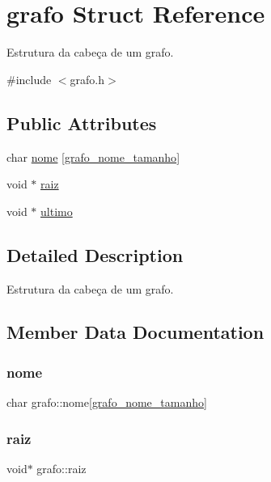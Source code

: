 \hypertarget{structgrafo}{}\section{grafo Struct Reference}
\label{structgrafo}


Estrutura da cabeça de um grafo.  




{\ttfamily \#include $<$grafo.\+h$>$}

\subsection*{Public Attributes}
\begin{DoxyCompactItemize}
\item 
char \hyperlink{structgrafo_ae059b6c156b25fa2f69feefdf5e5d62c}{nome} \mbox{[}\hyperlink{grafo_8h_a3d627c84159a5a51c9ceb84f916911c5}{grafo\+\_\+nome\+\_\+tamanho}\mbox{]}
\item 
void $\ast$ \hyperlink{structgrafo_adee962f194f38aa0fef97a672937be10}{raiz}
\item 
void $\ast$ \hyperlink{structgrafo_a48efa4c0bd5f3ed6dc25b56995d194e0}{ultimo}
\end{DoxyCompactItemize}


\subsection{Detailed Description}
Estrutura da cabeça de um grafo. 

\subsection{Member Data Documentation}
\mbox{\label{structgrafo_ae059b6c156b25fa2f69feefdf5e5d62c}} 
\subsubsection{\texorpdfstring{nome}{nome}}
{\footnotesize\ttfamily char grafo\+::nome\mbox{[}\hyperlink{grafo_8h_a3d627c84159a5a51c9ceb84f916911c5}{grafo\+\_\+nome\+\_\+tamanho}\mbox{]}}

\mbox{\label{structgrafo_adee962f194f38aa0fef97a672937be10}} 
\subsubsection{\texorpdfstring{raiz}{raiz}}
{\footnotesize\ttfamily void$\ast$ grafo\+::raiz}

